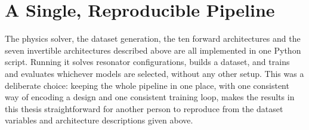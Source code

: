 \section{A Single, Reproducible Pipeline}

The physics solver, the dataset generation, the ten forward architectures and the seven invertible architectures described above are all implemented in one Python script. Running it solves resonator configurations, builds a dataset, and trains and evaluates whichever models are selected, without any other setup. This was a deliberate choice: keeping the whole pipeline in one place, with one consistent way of encoding a design and one consistent training loop, makes the results in this thesis straightforward for another person to reproduce from the dataset variables and architecture descriptions given above.
